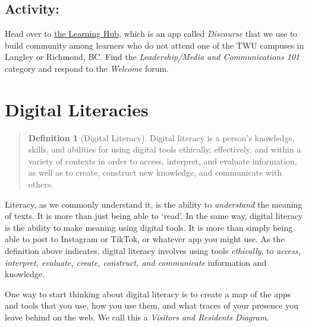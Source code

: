 \documentclass[
]{book}
\theoremstyle{definition}
\newtheorem{definition}{Definition}[chapter]
\theoremstyle{definition}
\theoremstyle{definition}
\theoremstyle{definition}
\theoremstyle{remark}
\begin{document}
\hypertarget{activity}{%
\subsection*{Activity:}\label{activity}}

\begin{reflect}
Head over to \href{https://twu.discourse.group}{the Learning Hub}, which is an app called \emph{Discourse} that we use to build community among learners who do not attend one of the TWU campuses in Langley or Richmond, BC. Find the \emph{Leadership/Media and Communications 101} category and respond to the \emph{Welcome} forum.
\end{reflect}

\hypertarget{digital-literacies}{%
\section{Digital Literacies}\label{digital-literacies}}

\begin{quote}
\begin{definition}[Digital Literacy]
\protect\hypertarget{def:diglit}{}\label{def:diglit}Digital literacy is a person's knowledge, skills, and abilities for using digital tools ethically, effectively, and within a variety of contexts in order to access, interpret, and evaluate information, as well as to create, construct new knowledge, and communicate with others. \citep{digitallearningadvisorycommitteePostSecondaryDigitalLearning2022}
\end{definition}
\end{quote}

Literacy, as we commonly understand it, is the ability to \emph{understand} the meaning of texts. It is more than just being able to `read'. In the same way, digital literacy is the ability to make meaning using digital tools. It is more than simply being able to post to Instagram or TikTok, or whatever app you might use. As the definition above indicates, digital literacy involves using tools \emph{ethically}, to \emph{access, interpret, evaluate, create, construct, and communicate} information and knowledge.

One way to start thinking about digital literacy is to create a map of the apps and tools that you use, how you use them, and what traces of your presence you leave behind on the web. We call this a \emph{Visitors and Residents Diagram}.
\end{document}
